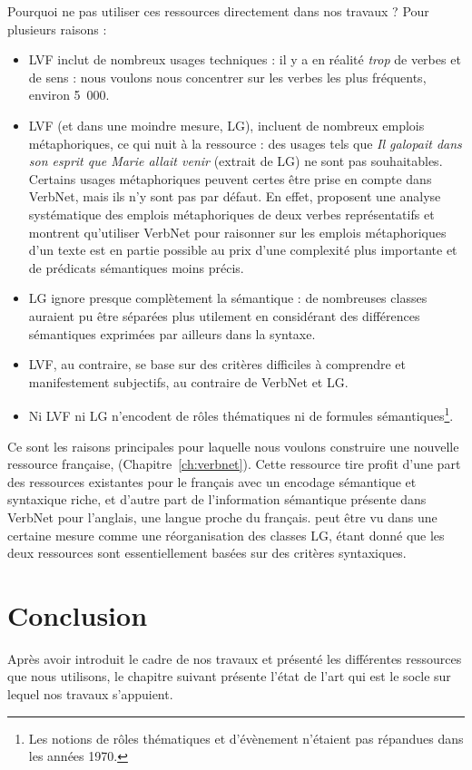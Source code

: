 
Pourquoi ne pas utiliser ces ressources directement dans nos travaux ? Pour
plusieurs raisons :

\begin{itemize}
    \item LVF inclut de nombreux usages techniques : il y a en réalité
        \textit{trop} de verbes et de sens : nous voulons nous concentrer sur les
        verbes les plus fréquents, environ 5~000.
    \item LVF (et dans une moindre mesure, LG), incluent de nombreux emplois
        métaphoriques, ce qui nuit à la ressource : des usages tels que
        \textit{Il galopait dans son esprit que Marie allait venir} (extrait de
        LG) ne sont pas souhaitables. Certains usages métaphoriques peuvent
        certes être prise en compte dans VerbNet, mais ils n'y sont pas par
        défaut. En effet, \cite{brown2012semantic} proposent une analyse
        systématique des emplois métaphoriques de deux verbes représentatifs et
        montrent qu'utiliser VerbNet pour raisonner sur les emplois
        métaphoriques d'un texte est en partie possible au prix d'une complexité
        plus importante et de prédicats sémantiques moins précis.
    \item LG ignore presque complètement la sémantique : de nombreuses classes
        auraient pu être séparées plus utilement en considérant des différences
        sémantiques exprimées par ailleurs dans la syntaxe.
    \item LVF, au contraire, se base sur des critères difficiles à comprendre et
        manifestement subjectifs, au contraire de VerbNet et LG.
    \item Ni LVF ni LG n'encodent de rôles thématiques ni de formules
        sémantiques\footnote{Les notions de rôles thématiques et d'évènement
        n'étaient pas répandues dans les années 1970.}.
\end{itemize}

Ce sont les raisons principales pour laquelle nous voulons construire une
nouvelle ressource française, \verbenet{} (Chapitre~\ref{ch:verbnet}). Cette
ressource tire profit d'une part des ressources existantes pour le français
avec un encodage sémantique et syntaxique riche, et d'autre part de
l'information sémantique présente dans VerbNet pour l'anglais, une langue
proche du français. \verbenet{} peut être vu dans une certaine mesure comme une
réorganisation des classes LG, étant donné que les deux ressources sont
essentiellement basées sur des critères syntaxiques.

\section*{Conclusion}

Après avoir introduit le cadre de nos travaux et présenté les différentes
ressources que nous utilisons, le chapitre suivant présente l'état de l'art qui
est le socle sur lequel nos travaux s'appuient.
